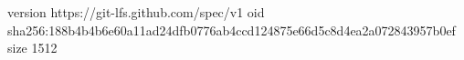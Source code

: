 version https://git-lfs.github.com/spec/v1
oid sha256:188b4b4b6e60a11ad24dfb0776ab4ccd124875e66d5c8d4ea2a072843957b0ef
size 1512
